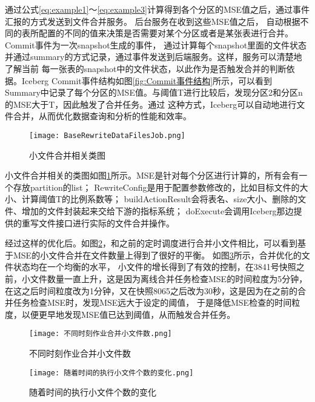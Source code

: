 通过公式\ref{eq:example1}～\ref{eq:example3}计算得到各个分区的MSE值之后，通过事件汇报的方式发送到文件合并服务。
后台服务在收到这些MSE值之后，
自动根据不同的表所配置的不同的值来决策是否需要对某个分区或者是某张表进行合并。 Commit事件为一次snapshot生成的事件，
通过计算每个snapshot里面的文件状态并通过summary的方式记录，通过事件发送到后端服务。这样，服务可以清楚地了解当前
每一张表的snapshot中的文件状态，以此作为是否触发合并的判断依据。Iceberg Commit事件结构如图\ref{fig:Commit事件结构}所示，可以看到
Summary中记录了每个分区的MSE值。与阈值T进行比较后，发现分区2和分区n的MSE大于T，因此触发了合并任务。通过
这种方式，Iceberg可以自动地进行文件合并，从而优化数据查询和分析的性能和效率。

\begin{figure}[H]
  \centering
  \texttt{[image: BaseRewriteDataFilesJob.png]}
  \caption{小文件合并相关类图}
  \label{fig:BaseRewriteDataFilesJob}
\end{figure}

小文件合并相关的类图如图\ref{fig:BaseRewriteDataFilesJob}所示。MSE是针对每个分区进行计算的，所有会有一个存放partition的list；
RewriteConfig是用于配置参数修改的，比如目标文件的大小、计算阈值T的比例系数等；
buildActionResult会将表名、size大小、删除的文件、增加的文件封装起来交给下游的指标系统；
doExecute会调用Iceberg那边提供的重写文件接口进行实际的文件合并操作。

经过这样的优化后。如图\ref{fig:不同时刻作业合并小文件数}，和之前的定时调度进行合并小文件相比，可以看到基于MSE的小文件合并在文件数量上得到了很好的平衡。
如图\ref{fig:随着时间的执行小文件个数的变化}所示，合并优化的文件状态均在一个均衡的水平，
小文件的增长得到了有效的控制，在3841号快照之前，小文件数量一直上升，这是因为离线合并任务检查MSE的时间粒度为5分钟，
在这之后时间粒度改为1分钟，又在快照8065之后改为30秒，这是因为在之前的合并任务检查MSE时，发现MSE远大于设定的阈值，
于是降低MSE检查的时间粒度，以便更早地发现MSE值已达到阈值，从而触发合并任务。

\begin{figure}[H]
  \centering
  \texttt{[image: 不同时刻作业合并小文件数.png]}
  \caption{不同时刻作业合并小文件数}
  \label{fig:不同时刻作业合并小文件数}
\end{figure}

\begin{figure}[H]
  \centering
  \texttt{[image: 随着时间的执行小文件个数的变化.png]}
  \caption{随着时间的执行小文件个数的变化}
  \label{fig:随着时间的执行小文件个数的变化}
\end{figure}

